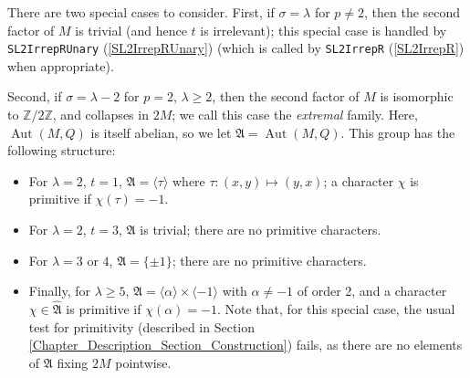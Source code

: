 \documentclass[a4paper,11pt]{report}
\begin{document}
{{{ There are two special cases to consider. First, if $\sigma = \lambda$ for $p \neq 2$, then the second factor of $M$ is trivial (and hence $t$ is irrelevant); this special case is handled by \texttt{SL2IrrepRUnary} (\ref{SL2IrrepRUnary}) (which is called by \texttt{SL2IrrepR} (\ref{SL2IrrepR}) when appropriate). 

 Second, if $\sigma = \lambda - 2$ for $p = 2$, $\lambda \geq 2$, then the second factor of $M$ is isomorphic to $\mathbb{Z}/2\mathbb{Z}$, and collapses in $2M$; we call this case the \emph{extremal} family. Here, $\operatorname{Aut}(M,Q)$ is itself abelian, so we let $\mathfrak{A} = \operatorname{Aut}(M,Q)$. This group has the following structure: 
\begin{itemize}
\item For $\lambda = 2$, $t=1$, $\mathfrak{A} = \langle \tau \rangle$ where $\tau : (x,y) \mapsto (y,x)$; a character $\chi$ is primitive if $\chi(\tau) = -1$.
\item For $\lambda = 2$, $t = 3$, $\mathfrak{A}$ is trivial; there are no primitive characters.
\item For $\lambda = 3$ or $4$, $\mathfrak{A} = \{\pm 1\}$; there are no primitive characters.
\item Finally, for $\lambda \geq 5$, $\mathfrak{A} = \langle \alpha \rangle \times \langle -1 \rangle$ with $\alpha \neq -1$ of order 2, and a character $\chi \in \widehat{\mathfrak{A}}$ is primitive if $\chi(\alpha) = -1$. Note that, for this special case, the usual test for primitivity (described
in Section \ref{Chapter_Description_Section_Construction}) fails, as there are no elements of $\mathfrak{A}$ fixing $2M$ pointwise.
\end{itemize}
 

}}}
\end{document}

